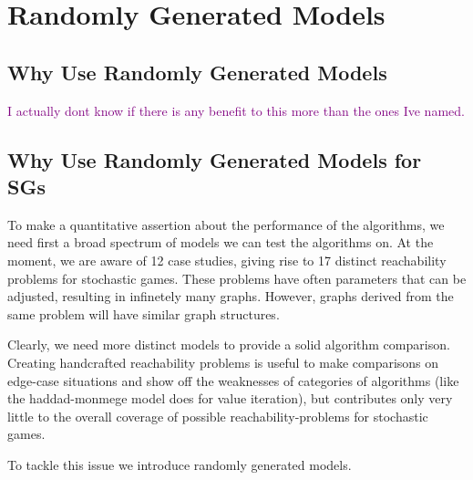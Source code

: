 \chapter{Randomly Generated Models} \label{ch:randomGen}
\section{Why Use Randomly Generated Models}
\textcolor{purple}{I actually dont know if there is any benefit to this more than the ones Ive named.}

\section{Why Use Randomly Generated Models for SGs}
To make a quantitative assertion about the performance of the algorithms, we need first a broad spectrum of models we can test the algorithms on. At the moment, we are aware of 12 case studies, giving rise to 17 distinct reachability problems for stochastic games. These problems have often parameters that can be adjusted, resulting in infinetely many graphs. However, graphs derived from the same problem will have similar graph structures.

Clearly, we need more distinct models to provide a solid algorithm comparison. Creating handcrafted reachability problems is useful to make comparisons on edge-case situations and show off the weaknesses of categories of algorithms (like the haddad-monmege model does for value iteration), but contributes only very little to the overall coverage of possible reachability-problems for stochastic games.

To tackle this issue we introduce randomly generated models.


